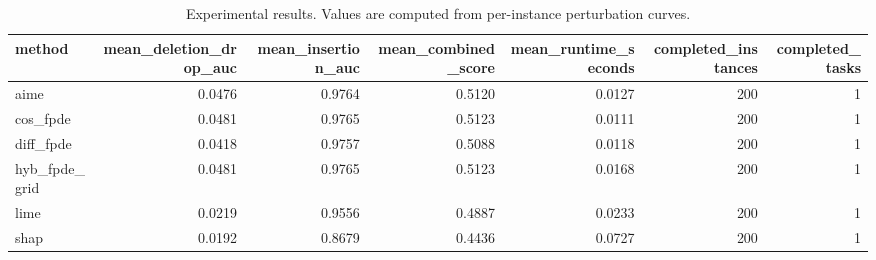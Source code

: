 \begin{table}[t]
\caption{Experimental results. Values are computed from per-instance perturbation curves.}
\label{tab:main_results_computed}
\centering
\begin{tabular}{lrrrrrr}
\toprule
method & mean\_deletion\_drop\_auc & mean\_insertion\_auc & mean\_combined\_score & mean\_runtime\_seconds & completed\_instances & completed\_tasks \\
\midrule
aime & 0.0476 & 0.9764 & 0.5120 & 0.0127 & 200 & 1 \\
cos\_fpde & 0.0481 & 0.9765 & 0.5123 & 0.0111 & 200 & 1 \\
diff\_fpde & 0.0418 & 0.9757 & 0.5088 & 0.0118 & 200 & 1 \\
hyb\_fpde\_grid & 0.0481 & 0.9765 & 0.5123 & 0.0168 & 200 & 1 \\
lime & 0.0219 & 0.9556 & 0.4887 & 0.0233 & 200 & 1 \\
shap & 0.0192 & 0.8679 & 0.4436 & 0.0727 & 200 & 1 \\
\bottomrule
\end{tabular}

\end{table}
